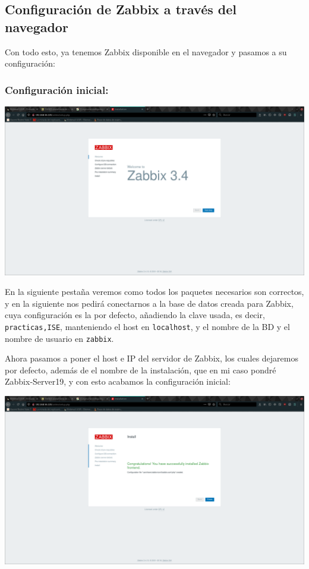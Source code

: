 \documentclass[12pt, spanish]{article}
\begin{document}
\subsection{Configuración de Zabbix a través del navegador}

Con todo esto, ya tenemos Zabbix disponible en el navegador y pasamos a su configuración:

\subsubsection{Configuración inicial:}

\begin{center}
\includegraphics[scale=0.25]{zabbix_instalado.png}
\end{center}

En la siguiente pestaña veremos como todos los paquetes necesarios son correctos, y en la siguiente nos pedirá conectarnos a la base de datos creada para Zabbix, cuya configuración es la por defecto, añadiendo la clave usada, es decir, \texttt{practicas,ISE}, manteniendo el host en \texttt{localhost}, y el nombre de la BD y el nombre de usuario en \texttt{zabbix}.

\newpage

Ahora pasamos a poner el host e IP del servidor de Zabbix, los cuales dejaremos por defecto, además de el nombre de la instalación, que en mi caso pondré Zabbix-Server19, y con esto acabamos la configuración inicial:

\begin{center}
\includegraphics[scale=0.25]{instalacion_acabada.png}
\end{center}
\end{document}
